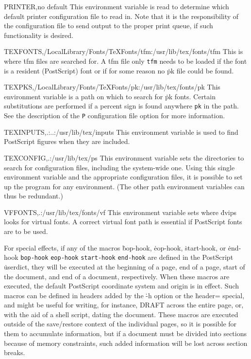 \descenv PRINTER,{\rm no default}
  This environment variable is read to determine which default printer
configuration file to read in.  Note that it is the responsibility of
the configuration file to send output to the proper print queue, if such
functionality is desired.

\descenv TEXFONTS,{/LocalLibrary/Fonts/TeXFonts/tfm:/usr/lib/tex/fonts/tfm}
  This is where \.{tfm} files are searched for.  A \.{tfm} file only
\^{{\tt tfm}}
needs to be loaded if the font is a resident (PostScript) font or if
for some reason no \.{pk} file could be found.

\descenv TEXPKS,{/LocalLibrary/Fonts/TeXFonts/pk:/usr/lib/tex/fonts/pk}
This environment variable is a path on which to search for \.{pk} fonts.
Certain substitutions are performed if a percent sign is found anywhere
\^{{\tt pk}}
in the path.  See the description of the {\tt P} configuration file
option for more information.

\descenv TEXINPUTS,{.:..:/usr/lib/tex/inputs}
  This environment variable is used to find PostScript figures when they
are included.

\descenv TEXCONFIG,{.:/usr/lib/tex/ps}
  This environment variable sets the directories to search for configuration
files, including the system-wide one.  Using this single environment variable
and the appropriate configuration files, it is possible to set up the program
for any environment.  (The other path environment variables can thus be
redundant.)

\descenv VFFONTS,{.:/usr/lib/tex/fonts/vf}
  This environment variable sets where \.{dvips} looks for virtual fonts.
A correct virtual font path is essential if PostScript fonts are to be
used.


For special effects, if any of the macros
\.{bop-hook}, \.{eop-hook}, \.{start-hook}, or \.{end-hook}
\^{{\tt bop-hook}}
\^{{\tt eop-hook}}
\^{{\tt start-hook}}
\^{{\tt end-hook}}
are defined in the PostScript \.{userdict}, they will be executed at the
beginning of a page, end of a page, start of the document, and end of
a document, respectively.
When these macros are executed, the default PostScript coordinate system
and origin
is in effect.  Such macros can be defined in headers added by the
\.{-h} option or the \.{header=}
special, and might be useful for writing, for instance, DRAFT across the
entire page, or, with the aid of a shell script, dating the document.
These macros are executed outside of the save/restore context of the
individual pages, so it is possible for them to accumulate information,
but if a document must be divided into sections because of memory
constraints, such added information will be lost across section breaks.

